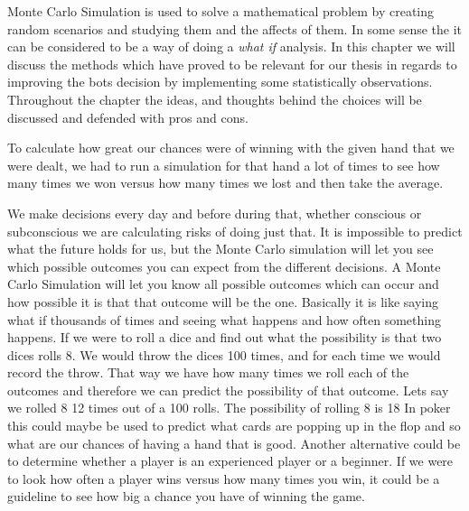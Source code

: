 Monte Carlo Simulation is used to solve a mathematical problem by creating random scenarios and studying them and the affects of them.
In some sense the it can be considered to be a way of doing a \textit{what if} analysis.
In this chapter we will discuss the methods which have proved to be relevant for our thesis in regards to improving the bots decision by implementing some statistically observations.
Throughout the chapter the ideas, and thoughts behind the choices will be discussed and defended with pros and cons.


To calculate how great our chances were of winning with the given hand that we were dealt, we had to run a simulation for that hand a lot of times to see how many times we won versus how many times we lost and then take the average. 


We make decisions every day and before during that, whether conscious or subconscious we are calculating risks of doing just that. It is impossible to predict what the future holds for us, but the Monte Carlo simulation will let you see which possible outcomes you can expect from the different decisions.
A Monte Carlo Simulation will let you know all possible outcomes which can occur and how possible it is that that outcome will be the one.
Basically it is like saying what if thousands of times and seeing what happens and how often something happens.
If we were to roll a dice and find out what the possibility is that two dices rolls 8. We would throw the dices 100 times, and for each time we would record the throw. That way we have how many times we roll each of the outcomes and therefore we can predict the possibility of that outcome.
Lets say we rolled 8 12 times out of a 100 rolls. The possibility of rolling 8 is 18%
In poker this could maybe be used to predict what cards are popping up in the flop and so what are our chances of having a hand that is good.
Another alternative could be to determine whether a player is an experienced player or a beginner. If we were to look how often a player wins versus how many times you win, it could be a guideline to see how big a chance you have of winning the game.

